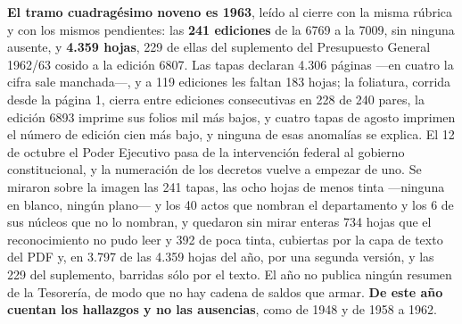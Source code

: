 \textbf{El tramo cuadragésimo noveno es 1963}, leído al cierre con la misma rúbrica y con los mismos pendientes: las \textbf{241 ediciones} de la 6769 a la 7009, sin ninguna ausente, y \textbf{4.359 hojas}, 229 de ellas del suplemento del Presupuesto General 1962/63 cosido a la edición 6807. Las tapas declaran 4.306 páginas ---en cuatro la cifra sale manchada---, y a 119 ediciones les faltan 183 hojas; la foliatura, corrida desde la página 1, cierra entre ediciones consecutivas en 228 de 240 pares, la edición 6893 imprime sus folios mil más bajos, y cuatro tapas de agosto imprimen el número de edición cien más bajo, y ninguna de esas anomalías se explica. El 12 de octubre el Poder Ejecutivo pasa de la intervención federal al gobierno constitucional, y la numeración de los decretos vuelve a empezar de uno. Se miraron sobre la imagen las 241 tapas, las ocho hojas de menos tinta ---ninguna en blanco, ningún plano--- y los 40 actos que nombran el departamento y los 6 de sus núcleos que no lo nombran, y quedaron sin mirar enteras 734 hojas que el reconocimiento no pudo leer y 392 de poca tinta, cubiertas por la capa de texto del PDF y, en 3.797 de las 4.359 hojas del año, por una segunda versión, y las 229 del suplemento, barridas sólo por el texto. El año no publica ningún resumen de la Tesorería, de modo que no hay cadena de saldos que armar. \textbf{De este año cuentan los hallazgos y no las ausencias}, como de 1948 y de 1958 a 1962.

